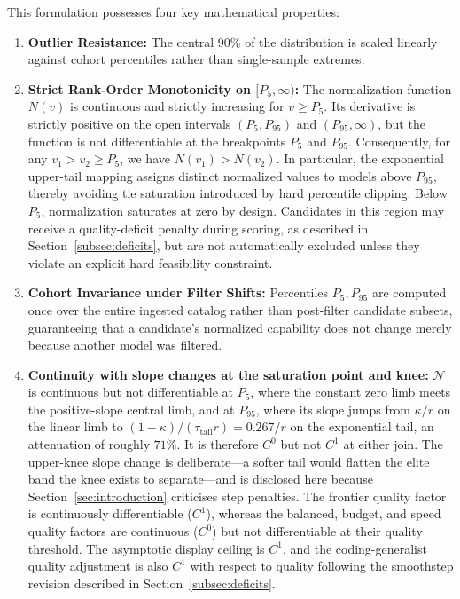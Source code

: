 \documentclass[pdflatex,sn-mathphys-num]{sn-jnl}
\theoremstyle{thmstyleone}
\theoremstyle{thmstylethree}
\begin{document}
This formulation possesses four key mathematical properties:
\begin{enumerate}
  \item \textbf{Outlier Resistance:} The central 90\% of the distribution is scaled linearly against cohort percentiles rather than single-sample extremes.
  \item \textbf{Strict Rank-Order Monotonicity on $[P_5, \infty)$:} The normalization function $N(v)$ is continuous and strictly increasing
for $v \geq P_5$. Its derivative is strictly positive on the open intervals
$(P_5,P_{95})$ and $(P_{95},\infty)$, but the function is not differentiable
at the breakpoints $P_5$ and $P_{95}$. Consequently, for any
$v_1 > v_2 \geq P_5$, we have $N(v_1) > N(v_2)$.
In particular, the exponential upper-tail mapping assigns distinct
normalized values to models above $P_{95}$, thereby avoiding tie
saturation introduced by hard percentile clipping.
Below $P_5$, normalization saturates at zero by design.
Candidates in this region may receive a quality-deficit penalty
during scoring, as described in Section~\ref{subsec:deficits},
but are not automatically excluded unless they violate an
explicit hard feasibility constraint.
  \item \textbf{Cohort Invariance under Filter Shifts:} Percentiles $P_5, P_{95}$ are computed once over the entire ingested catalog rather than post-filter candidate subsets, guaranteeing that a candidate's normalized capability does not change merely because another model was filtered.
  \item \textbf{Continuity with slope changes at the saturation point and knee:} $\mathcal{N}$ is continuous but not differentiable at $P_5$, where the constant zero limb meets the positive-slope central limb, and at $P_{95}$, where its slope jumps from $\kappa / r$ on the linear limb to $(1 - \kappa)/(\tau_{\mathrm{tail}} r) = 0.267 / r$ on the exponential tail, an attenuation of roughly $71\%$. It is therefore $C^0$ but not $C^1$ at either join. The upper-knee slope change is deliberate---a softer tail would flatten the elite band the knee exists to separate---and is disclosed here because Section~\ref{sec:introduction} criticises step penalties. The frontier quality factor is continuously differentiable (\(C^1\)), whereas the balanced, budget, and speed quality factors are continuous (\(C^0\)) but not differentiable at their quality threshold. The asymptotic display ceiling is \(C^1\), and the coding-generalist quality adjustment is also \(C^1\) with respect to quality following the smoothstep revision described in Section~\ref{subsec:deficits}.
\end{enumerate}
\end{document}
